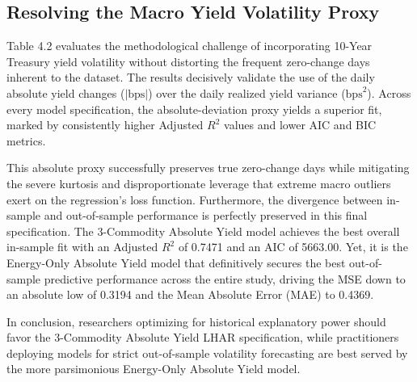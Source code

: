 \documentclass{report}
\begin{document}
\subsection{Resolving the Macro Yield Volatility Proxy}

Table 4.2 evaluates the methodological challenge of incorporating 10-Year Treasury yield volatility without distorting the frequent zero-change days inherent to the dataset. The results decisively validate the use of the daily absolute yield changes ($|\text{bps}|$) over the daily realized yield variance ($\text{bps}^2$). Across every model specification, the absolute-deviation proxy yields a superior fit, marked by consistently higher Adjusted $R^2$ values and lower AIC and BIC metrics. 

This absolute proxy successfully preserves true zero-change days while mitigating the severe kurtosis and disproportionate leverage that extreme macro outliers exert on the regression's loss function. Furthermore, the divergence between in-sample and out-of-sample performance is perfectly preserved in this final specification. The 3-Commodity Absolute Yield model achieves the best overall in-sample fit with an Adjusted $R^2$ of 0.7471 and an AIC of 5663.00. Yet, it is the Energy-Only Absolute Yield model that definitively secures the best out-of-sample predictive performance across the entire study, driving the MSE down to an absolute low of 0.3194 and the Mean Absolute Error (MAE) to 0.4369. 

In conclusion, researchers optimizing for historical explanatory power should favor the 3-Commodity Absolute Yield LHAR specification, while practitioners deploying models for strict out-of-sample volatility forecasting are best served by the more parsimonious Energy-Only Absolute Yield model.
\end{document}
